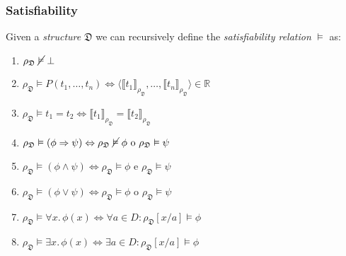 \documentclass{beamer}
\begin{document}
                \begin{frame}
                    \frametitle{Satisfiability}
                    \begin{definition}
                        Given a \textit{structure} $ \mathfrak{D} $ we can recursively define the \textit{satisfiability relation} $ \vDash $ as:
                        \begin{enumerate}
                            \item $ \rho_\mathfrak{D}\; \cancel{\vDash}\; \bot $
                            \item $ \rho_\mathfrak{D} \vDash P(t_1, \dots, t_n) \Leftrightarrow \langle \llbracket t_1 \rrbracket_{\rho_\mathfrak{D}}, \dots, \llbracket t_n \rrbracket_{\rho_\mathfrak{D}} \rangle \in \mathbb{R} $
                            \item $ \rho_\mathfrak{D} \vDash t_1 = t_2 \Leftrightarrow\llbracket t_1 \rrbracket_{\rho_\mathfrak{D}} = \llbracket t_2 \rrbracket_{\rho_\mathfrak{D}} $
                            \item $ \rho_\mathfrak{D} \vDash (\phi \Rightarrow \psi) \Leftrightarrow \rho_\mathfrak{D}\; \cancel{\vDash}\; \phi \text{ o } \rho_\mathfrak{D} \vDash \psi $
                            \item $ \rho_\mathfrak{D} \vDash (\phi \wedge \psi) \Leftrightarrow \rho_\mathfrak{D} \vDash \phi \text{ e } \rho_\mathfrak{D} \vDash \psi $
                            \item $ \rho_\mathfrak{D} \vDash (\phi \vee \psi) \Leftrightarrow \rho_\mathfrak{D} \vDash \phi \text{ o } \rho_\mathfrak{D} \vDash \psi $
                            \item $ \rho_\mathfrak{D} \vDash \forall x.\, \phi(x) \Leftrightarrow \forall a \in D: \rho_\mathfrak{D}[x/a] \vDash \phi $
                            \item $ \rho_\mathfrak{D} \vDash \exists x.\, \phi(x) \Leftrightarrow \exists a \in D: \rho_\mathfrak{D}[x/a] \vDash \phi $
                        \end{enumerate}
                    \end{definition}
                \end{frame}
\end{document}
